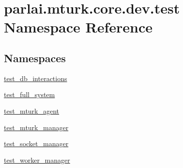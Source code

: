 \hypertarget{namespaceparlai_1_1mturk_1_1core_1_1dev_1_1test}{}\section{parlai.\+mturk.\+core.\+dev.\+test Namespace Reference}
\label{namespaceparlai_1_1mturk_1_1core_1_1dev_1_1test}
\subsection*{Namespaces}
\begin{DoxyCompactItemize}
\item 
 \hyperlink{namespaceparlai_1_1mturk_1_1core_1_1dev_1_1test_1_1test__db__interactions}{test\+\_\+db\+\_\+interactions}
\item 
 \hyperlink{namespaceparlai_1_1mturk_1_1core_1_1dev_1_1test_1_1test__full__system}{test\+\_\+full\+\_\+system}
\item 
 \hyperlink{namespaceparlai_1_1mturk_1_1core_1_1dev_1_1test_1_1test__mturk__agent}{test\+\_\+mturk\+\_\+agent}
\item 
 \hyperlink{namespaceparlai_1_1mturk_1_1core_1_1dev_1_1test_1_1test__mturk__manager}{test\+\_\+mturk\+\_\+manager}
\item 
 \hyperlink{namespaceparlai_1_1mturk_1_1core_1_1dev_1_1test_1_1test__socket__manager}{test\+\_\+socket\+\_\+manager}
\item 
 \hyperlink{namespaceparlai_1_1mturk_1_1core_1_1dev_1_1test_1_1test__worker__manager}{test\+\_\+worker\+\_\+manager}
\end{DoxyCompactItemize}

